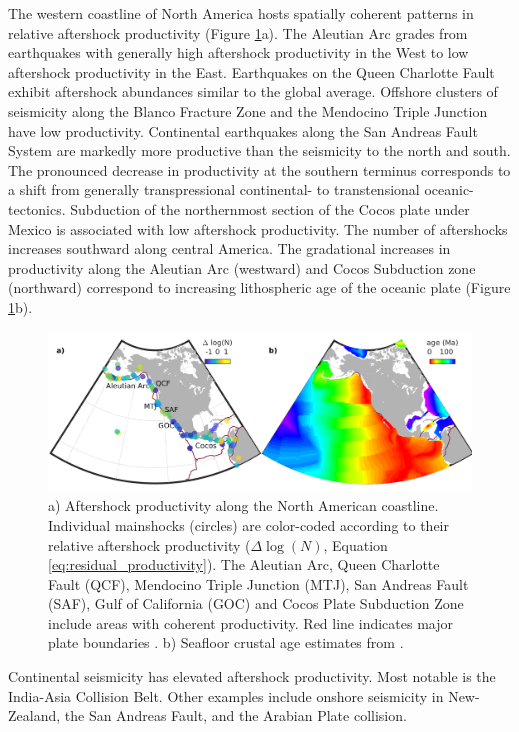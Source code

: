 \documentclass[draft]{agujournal2018}
\begin{document}
   The western coastline of North America hosts spatially coherent patterns in relative aftershock productivity (Figure \ref{fig:region}a). The Aleutian Arc grades from earthquakes with generally high aftershock productivity in the West to low aftershock productivity in the East. Earthquakes on the Queen Charlotte Fault exhibit aftershock abundances similar to the global average. Offshore clusters of seismicity along the Blanco Fracture Zone and the Mendocino Triple Junction have low productivity. Continental earthquakes along the San Andreas Fault System are markedly more productive than the seismicity to the north and south. The pronounced decrease in productivity at the southern terminus corresponds to a shift from generally transpressional continental- to transtensional oceanic-tectonics. Subduction of the northernmost section of the Cocos plate under Mexico is associated with low aftershock productivity. The number of aftershocks increases southward along central America. The gradational increases in productivity along the Aleutian Arc (westward) and Cocos Subduction zone (northward) correspond to increasing lithospheric age of the oceanic plate (Figure \ref{fig:region}b).

    \begin{figure}
        \centering
        \includegraphics[width = \linewidth]{figures/regions.png}
        \caption{a) Aftershock productivity along the North American coastline.  Individual mainshocks (circles) are color-coded according to their relative aftershock productivity ($\Delta \log(N)$, Equation \ref{eq:residual_productivity}). The Aleutian Arc, Queen Charlotte Fault (QCF), Mendocino Triple Junction (MTJ), San Andreas Fault (SAF), Gulf of California (GOC) and Cocos Plate Subduction Zone include areas with coherent productivity. Red line indicates major plate boundaries \citep{Bird2003AnBoundaries}. b) Seafloor crustal age estimates from \citet{Muller2008}.}
        \label{fig:region}
    \end{figure}
    
    Continental seismicity has elevated aftershock productivity. Most notable is the India-Asia Collision Belt. Other examples include onshore seismicity in New-Zealand, the San Andreas Fault, and the Arabian Plate collision.
    
\end{document}
